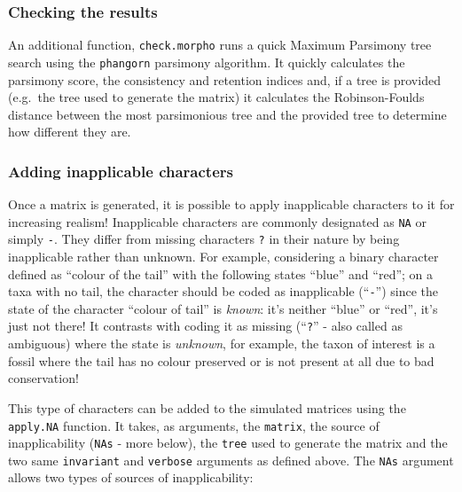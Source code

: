 \documentclass[]{book}
\theoremstyle{definition}
\theoremstyle{definition}
\theoremstyle{remark}
\begin{document}
\subsubsection{Checking the results}\label{checking-the-results}

An additional function, \texttt{check.morpho} runs a quick Maximum
Parsimony tree search using the \texttt{phangorn} parsimony algorithm.
It quickly calculates the parsimony score, the consistency and retention
indices and, if a tree is provided (e.g.~the tree used to generate the
matrix) it calculates the Robinson-Foulds distance between the most
parsimonious tree and the provided tree to determine how different they
are.

\subsubsection{Adding inapplicable
characters}\label{adding-inapplicable-characters}

Once a matrix is generated, it is possible to apply inapplicable
characters to it for increasing realism! Inapplicable characters are
commonly designated as \texttt{NA} or simply \texttt{-}. They differ
from missing characters \texttt{?} in their nature by being inapplicable
rather than unknown. For example, considering a binary character defined
as ``colour of the tail'' with the following states ``blue'' and
``red''; on a taxa with no tail, the character should be coded as
inapplicable (``\texttt{-}'') since the state of the character ``colour
of tail'' is \emph{known}: it's neither ``blue'' or ``red'', it's just
not there! It contrasts with coding it as missing (``\texttt{?}'' - also
called as ambiguous) where the state is \emph{unknown}, for example, the
taxon of interest is a fossil where the tail has no colour preserved or
is not present at all due to bad conservation!

This type of characters can be added to the simulated matrices using the
\texttt{apply.NA} function. It takes, as arguments, the \texttt{matrix},
the source of inapplicability (\texttt{NAs} - more below), the
\texttt{tree} used to generate the matrix and the two same
\texttt{invariant} and \texttt{verbose} arguments as defined above. The
\texttt{NAs} argument allows two types of sources of inapplicability:
\end{document}

